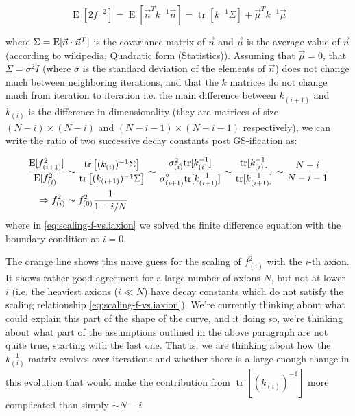 \documentclass[11pt]{article}
\begin{document}
\begin{equation}
     \displaystyle \operatorname {E}[2f^{-2}] = \displaystyle \operatorname {E} \left[\vec{n} ^{T} k^{-1} \vec{n} \right]=\operatorname {tr} \left[k^{-1} \Sigma \right]+\vec{\mu} ^{T} k^{-1} \vec{\mu}
\end{equation}

\noindent where $\Sigma = {\rm E}[\vec{n}\cdot \vec{n}^T]$ is the covariance matrix of $\vec{n}$ and $\vec{\mu}$ is the average value of $\vec{n}$ (according to wikipedia, Quadratic form (Statistics)). Assuming that $\vec{\mu}=0$, that $\Sigma = \sigma^2 I$ (where $\sigma$ is the standard deviation of the elements of $\vec n$) does not change much between neighboring iterations, and that the $k$ matrices do not change much from iteration to iteration i.e. the main difference between $k_{(i+1)}$ and $k_{(i)}$ is the difference in dimensionality (they are matrices of size $(N-i)\times (N-i)$ and $(N-i-1)\times (N-i-1)$ respectively), we can write the ratio of two successive decay constants post GS-ification as:

\begin{align}
    \frac{{\rm E}[f_{(i+1)}^2]}{{\rm E}[f_{(i)}^2]} & \sim \frac{ \operatorname {tr} \left[(k_{(i)})^{-1} \Sigma \right]}{\operatorname {tr} \left[(k_{(i+1)})^{-1} \Sigma \right]} \sim \frac{\sigma_{(i)}^2{\rm tr}[k_{(i)}^{-1}]}{\sigma_{(i + 1)}^2{\rm tr}[k_{(i+1)}^{-1}]}\sim \frac{{\rm tr}[k_{(i)}^{-1}]}{{\rm tr}[k_{(i+1)}^{-1}]}\sim \frac{N-i}{N-i-1} \\
    \Rightarrow f_{(i)}^2 & \sim f_{(0)}^2\frac{1}{1-i/N} \label{eq:scaling-f-vs.iaxion}
\end{align}
where in \cref{eq:scaling-f-vs.iaxion} we solved the finite difference equation with the boundary condition at $i = 0$.

The orange line shows this naive guess for the scaling of $f_{(i)}^2$ with the $i$-th axion. It shows rather good agreement for a large number of axions $N$, but not at lower $i$ (i.e. the heaviest axions ($i\ll N$) have decay constants which do not satisfy the scaling relationship \cref{eq:scaling-f-vs.iaxion}). We're currently thinking about what could explain this part of the shape of the curve, and it doing so, we're thinking about what part of the assumptions outlined in the above paragraph are not quite true, starting with the last one. That is, we are thinking about how the $k^{-1}_{(i)}$ matrix evolves over iterations and whether there is a large enough change in this evolution that would make the contribution from $\operatorname {tr} \left[(k_{(i)})^{-1}\right]$ more complicated than simply $\sim N-i$
\end{document}
